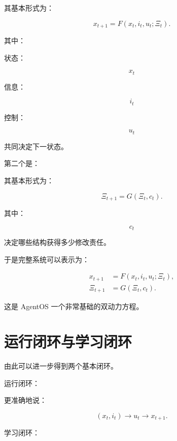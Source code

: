 其基本形式为：

\[
\boxed{
x_{t+1}
=
F(
x_t,
i_t,
u_t;
\Xi_t
).
}
\]

其中：

状态：

\[
x_t
\]

信息：

\[
i_t
\]

控制：

\[
u_t
\]

共同决定下一状态。

第二个是：

\begin{statementbox}
\centering
{}
\end{statementbox}

其基本形式为：

\[
\boxed{
\Xi_{t+1}
=
G(
\Xi_t,
c_t
).
}
\]

其中：

\[
c_t
\]

决定哪些结构获得多少修改责任。

于是完整系统可以表示为：

\[
\boxed{
\begin{aligned}
x_{t+1}
&=
F(x_t,i_t,u_t;\Xi_t),
\\
\Xi_{t+1}
&=
G(\Xi_t,c_t).
\end{aligned}
}
\]

这是 AgentOS 一个非常基础的双动力方程。

\section{运行闭环与学习闭环}

由此可以进一步得到两个基本闭环。

运行闭环：

\begin{statementbox}
\centering
{}
\end{statementbox}

更准确地说：

\[
(x_t,i_t)
\rightarrow
u_t
\rightarrow
x_{t+1}.
\]

学习闭环：

\begin{statementbox}
\centering
{}
\end{statementbox}


